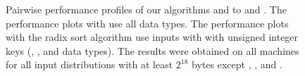\begin{figure}[tbp]
  \caption{Pairwise performance profiles of our algorithms
    \compissssort and \compissrsort to 
    \compspdq and \radixsska. The performance plots with \compissssort
    use all data types. The performance plots with the radix sort
    algorithm \compissrsort use inputs with with unsigned
    integer keys (\uint, \ulong, and \pair data types). The results
    were obtained on all machines for all input distributions with at
    least $2^{18}$ bytes except \distsorted, \distreversesorted, and
    \distones.}\label{fig:perf seq}
\end{figure}

